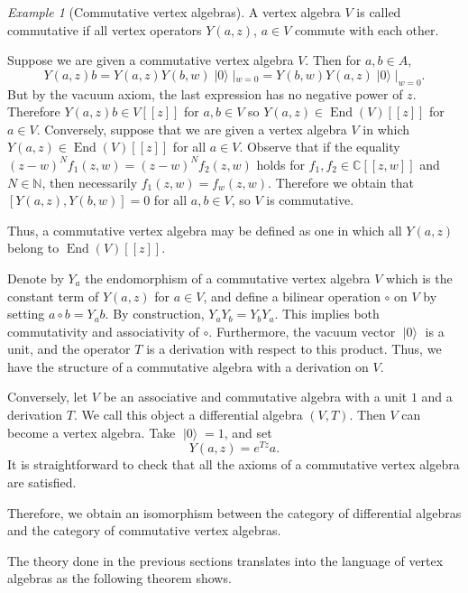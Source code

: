 \documentclass[a4paper, 12pt, reqno]{amsart}
\theoremstyle{remark}
\newtheorem{example}[theorem]{Example}
\numberwithin{equation}{subsection}
\DeclareMathOperator{\End}{End}
\DeclareMathOperator{\vac}{|0\rangle}
\begin{document}
\begin{example}[Commutative vertex algebras]
  \label{exa:4}
  A vertex algebra $V$ is called commutative if all vertex operators $Y(a, z)$, $a \in V$ commute with each other.
  
  Suppose we are given a commutative vertex algebra $V$.
  Then for $a, b \in A$,
  \begin{equation*}
    Y(a, z)b = Y(a, z)Y(b, w)\vac|_{w = 0} = Y(b, w)Y(a, z)\vac|_{w = 0}.
  \end{equation*}
  But by the vacuum axiom, the last expression has no negative power of $z$.
  Therefore $Y(a, z)b \in V[[z]]$ for $a, b \in V$ so $Y(a, z) \in \End(V)[[z]]$ for $a \in V$.
  Conversely, suppose that we are given a vertex algebra $V$ in which $Y(a, z) \in \End(V)[[z]]$ for all $a \in V$.
  Observe that if the equality $(z - w)^Nf_1(z, w) = (z - w)^Nf_2(z, w)$ holds for $f_1, f_2 \in \mathbb{C}[[z, w]]$ and $N \in \mathbb{N}$, then necessarily $f_1(z, w) = f_w(z, w)$.
  Therefore we obtain that $[Y(a, z), Y(b, w)] = 0$ for all $a, b \in V$, so $V$ is commutative.
  
  Thus, a commutative vertex algebra may be defined as one in which all $Y(a, z)$ belong to $\End(V)[[z]]$.

  Denote by $Y_a$ the endomorphism of a commutative vertex algebra $V$ which is the constant term of $Y(a, z)$ for $a \in V$, and define a bilinear operation $\circ$ on $V$ by setting $a\circ b=Y_ab$.
  By construction, $Y_aY_b = Y_bY_a$.
  This implies both commutativity and associativity of $\circ$.
  Furthermore, the vacuum vector $\vac$ is a unit, and the operator $T$ is a derivation with respect to this product.
  Thus, we have the structure of a commutative algebra with a derivation on $V$.

  Conversely, let $V$ be an associative and commutative algebra with a unit $1$ and a derivation $T$.
  We call this object a differential algebra $(V, T)$.
  Then $V$ can become a vertex algebra.
  Take $\vac = 1$, and set
  \begin{equation*}
    Y(a, z) = e^{Tz}a.
  \end{equation*}
  It is straightforward to check that all the axioms of a commutative vertex algebra are satisfied.

  Therefore, we obtain an isomorphism between the category of differential algebras and the category of commutative vertex algebras.
\end{example}

The theory done in the previous sections translates into the language of vertex algebras as the following theorem shows.
\end{document}
